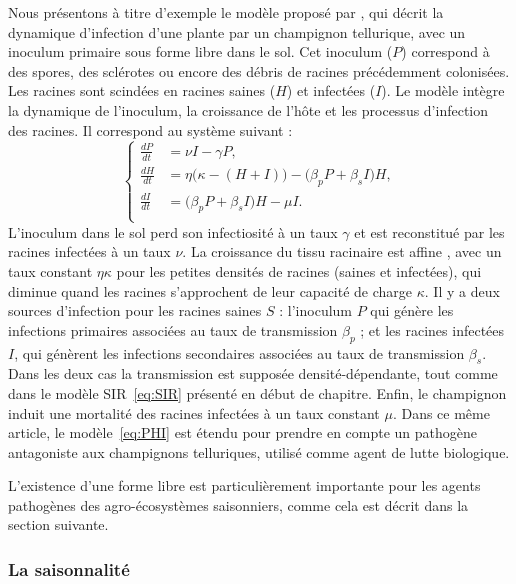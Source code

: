 	
	Nous présentons à titre d'exemple le modèle proposé par \citet{Cunniffe2011}, qui décrit la dynamique d'infection d'une plante par un champignon tellurique, avec un inoculum primaire sous forme libre dans le sol. Cet inoculum ($P$) correspond à des spores, des sclérotes ou encore des débris de racines précédemment colonisées. Les racines sont scindées en racines saines ($H$) et infectées ($I$). Le modèle intègre la dynamique de l'inoculum, la croissance de l'hôte et les processus d'infection des racines. Il correspond au système suivant :
	\begin{equation}
	  \left\{
	    \begin{aligned}
	      \frac{dP}{dt} &= \nu I -  \gamma P, \\
	      \frac{dH}{dt} &= \eta  \big(\kappa - (H + I)  \big) -  \big(\beta_p P + \beta_s I  \big)H,\\
	      \frac{dI}{dt} &= \big(\beta_p P +  \beta_s I  \big) H - \mu I.\\
	    \end{aligned}
	  \right.
	  \label{eq:PHI}
	\end{equation}
	L'inoculum dans le sol perd son infectiosité à un taux $\gamma$ et est reconstitué par les racines infectées à un taux $\nu$. La croissance du tissu racinaire est \og affine \fg{}, avec un taux constant $\eta\kappa$ pour les petites densités de racines (saines et infectées), qui diminue quand les racines s'approchent de leur capacité de charge $\kappa$. Il y a deux sources d'infection pour les racines saines $S$ : l'inoculum $P$ qui génère les infections primaires associées au taux de transmission $\beta_p$ ; et les racines infectées $I$, qui génèrent les infections secondaires associées au taux de transmission $\beta_s$. Dans les deux cas la transmission est supposée densité-dépendante, tout comme dans le modèle SIR~\eqref{eq:SIR} présenté en début de chapitre. Enfin, le champignon induit une mortalité des racines infectées à un taux constant $\mu$. 
	Dans ce même article, le modèle~\eqref{eq:PHI} est étendu pour prendre en compte un pathogène antagoniste aux champignons telluriques, utilisé comme agent de lutte biologique.
	
	L'existence d'une forme libre est particulièrement importante pour les agents pathogènes des agro-écosystèmes saisonniers, comme cela est décrit dans la section suivante.
	
	
\subsubsection{La saisonnalité}
\label{sec:sais}
	
